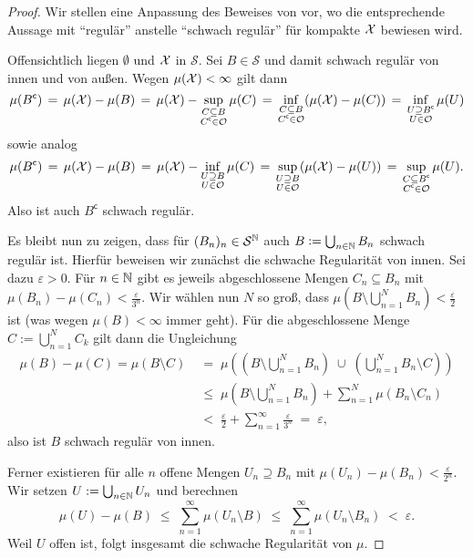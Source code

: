 \documentclass[../thesis/thesis.tex]{subfiles}
\begin{document}
	\begin{proof}
		Wir stellen eine Anpassung des Beweises von 
		\cite[Hilfssatz 4.5.5]{Simon.2015} vor, wo die entsprechende Aussage mit \enquote{regulär} 
		anstelle \enquote{schwach regulär} für kompakte $\mathcal{X}$ bewiesen wird.
		
		Offensichtlich liegen $\emptyset$ und $\mathcal{X}$ in $\mathcal{S}$. Sei 
		$B \in \mathcal{S}$ und damit schwach regulär 
		von innen und von außen. Wegen $\mu(\mathcal{X}) < \infty$ gilt dann
		$$\mu(B^\mathsf{c}) 
		\, = \, \mu(\mathcal{X}) - \mu(B) 
		\, = \, \mu(\mathcal{X}) - \sup_{\substack{C \subseteq B \\ C^\mathsf{c} \in \mathcal{O}}} \mu(C) 
		\, = \, \inf_{\substack{C \subseteq B \\ C^\mathsf{c} \in \mathcal{O}}} (\mu(\mathcal{X}) - \mu(C))
		\, = \, \inf_{\substack{U \supseteq B^\mathsf{c} \\ U \in \mathcal{O}}} \mu(U)$$
		sowie analog
		$$\mu(B^\mathsf{c}) 
		\, = \, \mu(\mathcal{X}) - \mu(B) 
		\, = \, \mu(\mathcal{X}) - \inf_{\substack{U \supseteq B \\ U \in \mathcal{O}}} \mu(C)
		\, = \, \sup_{\substack{U \supseteq B \\ U \in \mathcal{O}}} (\mu(\mathcal{X}) - \mu(U))
		\, = \, \sup_{\substack{C \subseteq B^\mathsf{c} \\ C^\mathsf{c} \in 
				\mathcal{O}}} \mu(U) \text{.}$$
		Also ist auch $B^\mathsf{c}$ schwach regulär. 
		
		Es bleibt nun zu zeigen, dass für $(B_n)_n \in \mathcal{S}^{\mathbb{N}}$ auch $B \vcentcolon = 
		\bigcup_{n \in \mathbb{N}} B_n$ schwach regulär ist. 
		Hierfür beweisen wir zunächst die schwache Regularität von innen. 
		Sei dazu $\varepsilon > 0$. Für $n \in \mathbb{N}$ gibt es jeweils abgeschlossene Mengen 
		$C_n \subseteq B_n$ mit $\mu(B_n) - \mu(C_n) < \frac{\varepsilon}{3^n}$.
		Wir wählen nun $N$ so groß, dass $\mu\left( B \setminus \bigcup_{n=1}^N B_n \right) 
		< \frac{\varepsilon}{2}$ ist (was wegen $\mu(B) < \infty$ immer geht). 
		Für die abgeschlossene Menge $C := \bigcup_{n=1}^N C_k$ gilt dann die Ungleichung 
		\begin{align*}
			\mu(B) - \mu(C) = \mu(B\setminus C) \; &=
			\; \mu\left( \left( B \setminus \bigcup_{n=1}^N B_n \right) \; \cup \; 
			\left( \bigcup_{n=1}^N B_n  \setminus C \right) \right) \\
			&\leq \; \mu \left( B \setminus \bigcup_{n=1}^N B_n \right) + 
			\sum_{n=1}^{N} \mu(B_n \setminus C_n) \\
			&<    \; \frac{\varepsilon}{2} + 
			\sum_{n=1}^{\infty} \frac{\varepsilon}{3^n} \; = \; \varepsilon \text{,}
		\end{align*}
		also ist $B$ schwach regulär von innen.
		
		Ferner existieren für alle $n$ offene Mengen $U_n \supseteq B_n$ 
		mit $\mu(U_n) - \mu(B_n) < \frac{\varepsilon}{2^n}$. Wir setzen 
		$U := \bigcup_{n \in \mathbb{N}} U_n$ und berechnen  
		$$\mu(U) - \mu(B) \; \leq \; \sum_{n=1}^\infty \mu(U_n \setminus B) \; \leq \; 
		\sum_{n=1}^\infty \mu(U_n \setminus B_n) \; < \; \varepsilon \text{.}$$
		Weil $U$ offen ist, folgt insgesamt die schwache Regularität von $\mu$.
	\end{proof}
	
\end{document}
